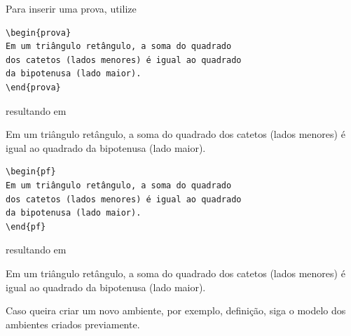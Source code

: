 Para inserir uma prova, utilize
\if{}
\begin{verbatim}
\begin{prova}
Em um triângulo retângulo, a soma do quadrado 
dos catetos (lados menores) é igual ao quadrado 
da bipotenusa (lado maior). 
\end{prova}
\end{verbatim}
resultando em

\begin{prova}    %
Em um triângulo retângulo, a soma do quadrado dos catetos (lados menores) é igual ao quadrado da bipotenusa (lado maior). 
\end{prova}
\else
\begin{verbatim}
\begin{pf}
Em um triângulo retângulo, a soma do quadrado 
dos catetos (lados menores) é igual ao quadrado 
da bipotenusa (lado maior). 
\end{pf}
\end{verbatim}
resultando em

\begin{pf}    %
Em um triângulo retângulo, a soma do quadrado dos catetos (lados menores) é igual ao quadrado da bipotenusa (lado maior). 
\end{pf}
\fi

Caso queira criar um novo ambiente, por exemplo, definição, siga o modelo dos ambientes 
criados previamente.


